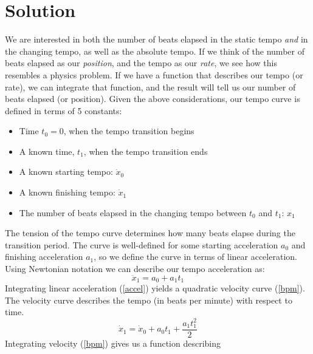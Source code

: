 \section{Solution}
\label{sec:polytempic-solution}
We are interested in both the number of beats elapsed in the static
tempo \emph{and} in the changing tempo, as well as the absolute
tempo. If we think of the number of beats elapsed as our
\emph{position}, and the tempo as our \emph{rate}, we see how this
resembles a physics problem. If we have a function that describes our
tempo (or rate), we can integrate that function, and the result will
tell us our number of beats elapsed (or position). Given the above
considerations, our tempo curve is defined in terms of 5 constants:
\hfill\break
\begin{fullwidth}
\begin{itemize}
  \item Time $t_0=0$, when the tempo transition begins
  \item A known time, $t_1$, when the tempo transition ends
  \item A known starting tempo: $\dot{x}_0$
  \item A known finishing tempo: $\dot{x}_1$
  \item The number of beats elapsed in the changing tempo between
    $t_0$ and $t_1$: $x_1$
\end{itemize}
\end{fullwidth}
\hfill\break
The tension of the tempo curve determines how many beats elapse during
the transition period. The curve is well-defined for some starting
acceleration $a_0$ and finishing acceleration $a_1$, so we define the
curve in terms of linear acceleration. Using Newtonian notation we can
describe our tempo acceleration as:
\begin{equation}
	\label{accel}
    \ddot{x}_1 = a_0 + a_1t_1
\end{equation}
Integrating linear acceleration (\ref{accel}) yields a quadratic
velocity curve (\ref{bpm}). The velocity curve describes the tempo (in beats per
minute) with respect to
time.
\begin{equation}
	\label{bpm}
    \dot{x}_1 = \dot{x}_0 + a_0t_1 + \frac{a_1t_1^2}{2}
\end{equation}
Integrating velocity (\ref{bpm}) gives us a function describing
